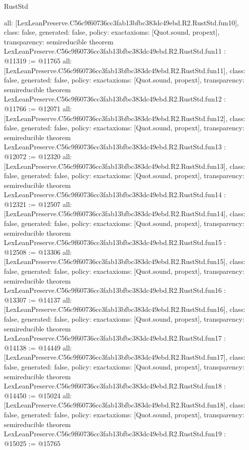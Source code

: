 \begin{lexlean}{RustStd}
\begin{coremodule}
{  all: [LexLeanPreserve.C56c9f60736cc3fab13bfbc383dc49ebd.R2.RustStd.fun10],
  class: false,
  generated: false,
  policy: exact{axioms: [Quot.sound, propext]},
  transparency: semireducible
}
theorem LexLeanPreserve.C56c9f60736cc3fab13bfbc383dc49ebd.R2.RustStd.fun11 : @11319 := @11765 {
  all: [LexLeanPreserve.C56c9f60736cc3fab13bfbc383dc49ebd.R2.RustStd.fun11],
  class: false,
  generated: false,
  policy: exact{axioms: [Quot.sound, propext]},
  transparency: semireducible
}
theorem LexLeanPreserve.C56c9f60736cc3fab13bfbc383dc49ebd.R2.RustStd.fun12 : @11766 := @12071 {
  all: [LexLeanPreserve.C56c9f60736cc3fab13bfbc383dc49ebd.R2.RustStd.fun12],
  class: false,
  generated: false,
  policy: exact{axioms: [Quot.sound, propext]},
  transparency: semireducible
}
theorem LexLeanPreserve.C56c9f60736cc3fab13bfbc383dc49ebd.R2.RustStd.fun13 : @12072 := @12320 {
  all: [LexLeanPreserve.C56c9f60736cc3fab13bfbc383dc49ebd.R2.RustStd.fun13],
  class: false,
  generated: false,
  policy: exact{axioms: [Quot.sound, propext]},
  transparency: semireducible
}
theorem LexLeanPreserve.C56c9f60736cc3fab13bfbc383dc49ebd.R2.RustStd.fun14 : @12321 := @12507 {
  all: [LexLeanPreserve.C56c9f60736cc3fab13bfbc383dc49ebd.R2.RustStd.fun14],
  class: false,
  generated: false,
  policy: exact{axioms: [Quot.sound, propext]},
  transparency: semireducible
}
theorem LexLeanPreserve.C56c9f60736cc3fab13bfbc383dc49ebd.R2.RustStd.fun15 : @12508 := @13306 {
  all: [LexLeanPreserve.C56c9f60736cc3fab13bfbc383dc49ebd.R2.RustStd.fun15],
  class: false,
  generated: false,
  policy: exact{axioms: [Quot.sound, propext]},
  transparency: semireducible
}
theorem LexLeanPreserve.C56c9f60736cc3fab13bfbc383dc49ebd.R2.RustStd.fun16 : @13307 := @14137 {
  all: [LexLeanPreserve.C56c9f60736cc3fab13bfbc383dc49ebd.R2.RustStd.fun16],
  class: false,
  generated: false,
  policy: exact{axioms: [Quot.sound, propext]},
  transparency: semireducible
}
theorem LexLeanPreserve.C56c9f60736cc3fab13bfbc383dc49ebd.R2.RustStd.fun17 : @14138 := @14449 {
  all: [LexLeanPreserve.C56c9f60736cc3fab13bfbc383dc49ebd.R2.RustStd.fun17],
  class: false,
  generated: false,
  policy: exact{axioms: [Quot.sound, propext]},
  transparency: semireducible
}
theorem LexLeanPreserve.C56c9f60736cc3fab13bfbc383dc49ebd.R2.RustStd.fun18 : @14450 := @15024 {
  all: [LexLeanPreserve.C56c9f60736cc3fab13bfbc383dc49ebd.R2.RustStd.fun18],
  class: false,
  generated: false,
  policy: exact{axioms: [Quot.sound, propext]},
  transparency: semireducible
}
theorem LexLeanPreserve.C56c9f60736cc3fab13bfbc383dc49ebd.R2.RustStd.fun19 : @15025 := @15765 {
}
\end{coremodule}
\end{lexlean}
